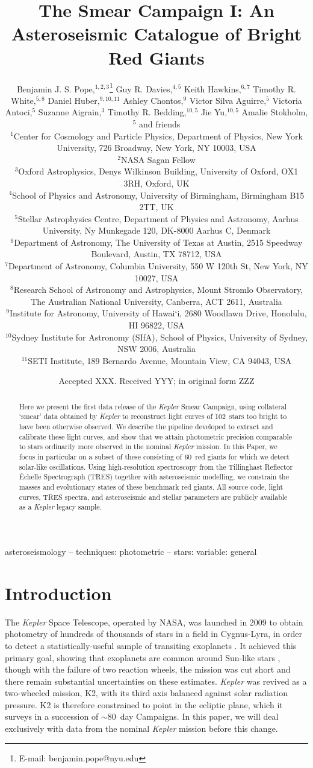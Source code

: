 \documentclass[a4paper,fleqn,usenatbib]{mnras}
\title[The Kepler Smear Campaign]{The \kepler Smear Campaign I: An Asteroseismic Catalogue of Bright Red Giants}
\author[B. J. S. Pope et al.]{Benjamin J. S. Pope,$^{1,2,3}$\thanks{E-mail: benjamin.pope@nyu.edu}
Guy R. Davies,$^{4,5}$
Keith Hawkins,$^{6,7}$
Timothy R. White,$^{5,8}$\newauthor
Daniel Huber,$^{9,10,11}$
Ashley Chontos,$^{9}$
Victor Silva Aguirre,$^{5}$
Victoria Antoci,$^{5}$\newauthor
Suzanne Aigrain,$^{3}$ 
Timothy R. Bedding,$^{10,5}$
Jie Yu,$^{10,5}$ 
Amalie Stokholm,$^{5}$\newauthor
and friends
\\
$^{1}$Center for Cosmology and Particle Physics, Department of Physics, New York University, 726 Broadway, New York, NY 10003, USA\\
$^{2}$NASA Sagan Fellow\\
$^{3}$Oxford Astrophysics, Denys Wilkinson Building, University of Oxford, OX1 3RH, Oxford, UK\\
$^{4}$School of Physics and Astronomy, University of Birmingham, Birmingham B15 2TT, UK\\
$^{5}$Stellar Astrophysics Centre, Department of Physics and Astronomy, Aarhus University, Ny Munkegade 120, DK-8000 Aarhus C, Denmark\\
$^{6}$Department of Astronomy, The University of Texas at Austin, 2515 Speedway Boulevard, Austin, TX 78712, USA\\
$^{7}$Department of Astronomy, Columbia University, 550 W 120th St, New York, NY 10027, USA\\
$^{8}$Research School of Astronomy and Astrophysics, Mount Stromlo Observatory, The Australian National University, Canberra, ACT 2611, Australia\\
$^{9}$Institute for Astronomy, University of Hawai‘i, 2680 Woodlawn Drive, Honolulu, HI 96822, USA\\
$^{10}$Sydney Institute for Astronomy (SIfA), School of Physics, University of Sydney, NSW 2006, Australia\\
$^{11}$SETI Institute, 189 Bernardo Avenue, Mountain View, CA 94043, USA
}
\date{Accepted XXX. Received YYY; in original form ZZZ}
\newcommand{\kepler}{\emph{Kepler}\xspace}
\begin{document}
\label{firstpage}
\pagerange{\pageref{firstpage}--\pageref{lastpage}}
\maketitle

\begin{abstract}
Here we present the first data release of the \kepler Smear Campaign, using collateral `smear' data obtained by \kepler to reconstruct light curves of 102~stars too bright to have been otherwise observed. We describe the pipeline developed to extract and calibrate these light curves, and show that we attain photometric precision comparable to stars ordinarily more observed in the nominal \kepler mission. In this Paper, we focus in particular on a subset of these consisting of 60~red giants for which we detect solar-like oscillations. Using high-resolution spectroscopy from the Tillinghast Reflector \'{E}chelle Spectrograph (TRES) together with asteroseismic modelling, we constrain the masses and evolutionary states of these benchmark red giants. All source code, light curves, TRES spectra, and asteroseismic and stellar parameters are publicly available as a \kepler legacy sample.
\end{abstract}

\begin{keywords}
asteroseismology -- techniques: photometric -- stars: variable: general
\end{keywords}



\section{Introduction}
\label{intro}

The \kepler Space Telescope, operated by NASA, was launched in 2009 to obtain photometry of hundreds of thousands of stars in a field in Cygnus-Lyra, in order to detect a statistically-useful sample of transiting exoplanets \citep{2010Sci...327..977B}. It achieved this primary goal, showing that exoplanets are common around Sun-like stars \citep{2013ApJ...766...81F,2013PNAS..11019273P,2014ApJ...795...64F}, though with the failure of two reaction wheels, the mission was cut short and there remain substantial uncertainties on these estimates. \kepler was revived as a two-wheeled mission, K2, with its third axis balanced against solar radiation pressure. K2 is therefore constrained to point in the ecliptic plane, which it surveys in a succession of $\sim 80$~day Campaigns. In this paper, we will deal exclusively with data from the nominal \kepler mission before this change.
\end{document}
